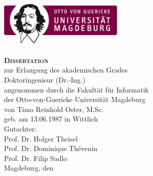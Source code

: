 \begin{titlepage}
\setlength{\parindent}{0cm}%
\begin{Large}
\begin{centering}
\includegraphics[width=6cm]{figures/OvGU-Logo.jpg}\\
\vspace*{2cm}
{\scshape\bfseries\huge \thetitle}\\
\vspace*{2\baselineskip}
{\scshape\bfseries\LARGE Dissertation}\\
\vspace*{\baselineskip}
zur Erlangung des akademischen Grades\\
\vspace*{\baselineskip}
Doktoringenieur (Dr.-Ing.)\\
\vfill
angenommen durch die Fakultät für Informatik\\
der Otto-von-Guericke Universität Magdeburg\\
\vspace*{\baselineskip}
von Timo Reinhold Oster, M.Sc.\\
geb. am 13.06.1987 in Wittlich\\
\vspace*{\baselineskip}
Gutachter:\\
Prof. Dr. Holger Theisel\\
Prof. Dr. Dominique Th\'evenin\\
Prof. Dr. Filip Sadlo\\
\vspace*{\baselineskip}
Magdeburg, den \thedate\\
\end{centering}
\end{Large}
\end{titlepage}
